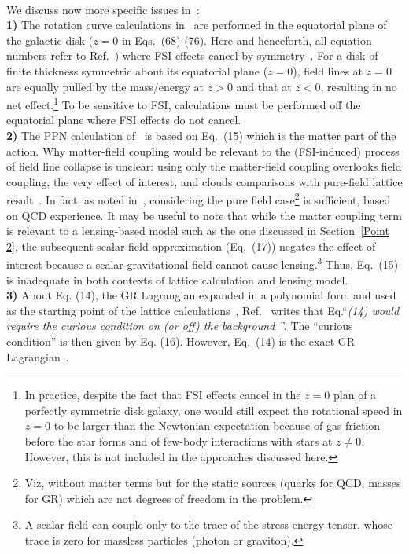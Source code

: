 \documentclass[superscriptaddress,amsmath,amssymb,nofootinbib]{revtex4}
\begin{document}
~\\
We discuss now more specific issues in~\cite{Barker:2023xsx}: \\
{\bf 1)} The rotation curve calculations in~\cite{Barker:2023xsx} are performed in the equatorial plane of the galactic disk ($z=0$ in Eqs.~(68)-(76). 
Here and henceforth, all equation numbers refer to Ref.~\cite{Barker:2023xsx})
where FSI effects cancel by symmetry~\cite{Deur:2009ya, Deur:2020wlg}. For a disk of finite thickness symmetric about its equatorial plane ($z=0$), field lines at $z=0$ are equally pulled by the mass/energy at $z>0$ and that at $z<0$, 
resulting in no net effect.\footnote{
In practice, despite the fact that FSI effects cancel in the $z=0$ plan of a perfectly symmetric disk galaxy, one would still expect the rotational speed in $z=0$ to be larger than the Newtonian expectation because of gas friction before the star forms and of few-body interactions with stars at $z \neq 0$. However, this is not included in the approaches discussed here.
} To be sensitive to FSI, calculations must be performed off the equatorial plane where FSI effects do not cancel. \\
{\bf 2)} The PPN calculation of~\cite{Barker:2023xsx} is based on Eq.~(15)
which is the matter part of the action. Why matter-field coupling would be relevant to the (FSI-induced) process of field line collapse  is unclear: 
using only the matter-field coupling overlooks field coupling, the very effect of interest,  and clouds comparisons with pure-field lattice result~\cite{Deur:2009ya, Deur:2016bwq}.
In fact, as noted in~\cite{Deur:2009ya}, considering the pure field case\footnote{
Viz, without matter terms but for the static sources (quarks for QCD, masses for GR) which are not degrees of freedom in the problem.} 
is sufficient, based on QCD experience.
It may be useful to note that while the matter coupling term is relevant to a lensing-based model such as the one discussed in Section~\ref{Point 2}, the subsequent 
scalar field approximation (Eq.~(17)) negates the effect of interest because a scalar gravitational field cannot cause lensing.\footnote{ 
A scalar field can couple only to the trace of the stress-energy tensor, whose trace is zero for massless particles (photon or graviton).}
 Thus, Eq.~(15) is inadequate in both contexts of lattice calculation and lensing model.\\
%
{\bf 3)} About Eq. (14), the GR Lagrangian expanded in a polynomial form and used as the starting point of the lattice calculations~\cite{Deur:2009ya, Deur:2016bwq}, Ref.~\cite{Barker:2023xsx} writes that Eq.``{\it (14) would require the curious condition on (or off) the background}~''. The ``curious condition'' is then given by Eq. (16). However, Eq.~(14) is the exact GR Lagrangian~\cite{Zee2, Zee1, Salam:1974zw}. %
\end{document}
